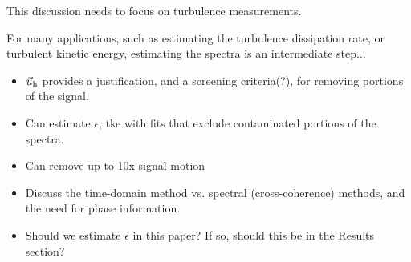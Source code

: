 This discussion needs to focus on turbulence measurements.

For many applications, such as estimating the turbulence dissipation rate, or turbulent kinetic energy, estimating the spectra is an intermediate step...
\begin{itemize}
\item $\vec{u}_\mathrm{h}$ provides a justification, and a screening criteria(?), for removing portions of the signal.
\item Can estimate $\epsilon$, tke with fits that exclude contaminated portions of the spectra.
\item Can remove up to 10x signal motion
\item Discuss the time-domain method vs. spectral (cross-coherence) methods, and the need for phase information.
\item Should we estimate $\epsilon$ in this paper? If so, should this be in the Results section?
\end{itemize}



